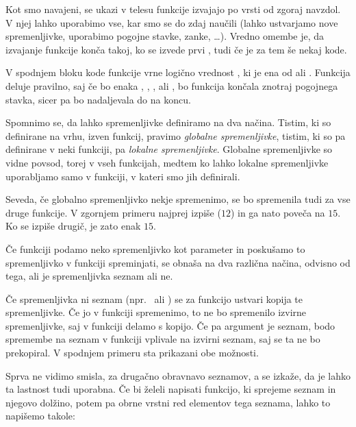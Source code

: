 
Kot smo navajeni, se ukazi v telesu funkcije izvajajo po vrsti od zgoraj
navzdol.
V njej lahko uporabimo vse, kar smo se do zdaj naučili (lahko ustvarjamo nove
spremenljivke, uporabimo pogojne stavke, zanke, \ldots).
Vredno omembe je, da izvajanje funkcije konča takoj, ko se izvede prvi
, tudi če je za tem še nekaj kode.

V spodnjem bloku kode funkcije vrne logično vrednost , ki je ena od
 ali .
Funkcija deluje pravilno, saj če bo  enaka , ,
,  ali , bo funkcija končala znotraj pogojnega
stavka, sicer pa bo nadaljevala do  na koncu.



Spomnimo se, da lahko spremenljivke definiramo na dva načina.
Tistim, ki so definirane na vrhu, izven funkcij, pravimo \emph{globalne
  spremenljivke}, tistim, ki so pa definirane v neki funkciji, pa \emph{lokalne
  spremenljivke}.
Globalne spremenljivke so vidne povsod, torej v vseh funkcijah, medtem ko lahko
lokalne spremenljivke uporabljamo samo v funkciji, v kateri smo jih definirali.


Seveda, če globalno spremenljivko nekje spremenimo, se bo spremenila tudi za
vse druge funkcije.
V zgornjem primeru  najprej izpiše  ($12$) in ga
nato poveča na $15$.
Ko se  izpiše drugič, je zato enak $15$.

Če funkciji podamo neko spremenljivko kot parameter in poskušamo to
spremenljivko v funkciji spreminjati, se obnaša na dva različna načina, odvisno
od tega, ali je spremenljivka seznam ali ne.

Če spremenljivka ni seznam (npr.~ ali ) se za funkcijo
ustvari kopija te spremenljivke.
Če jo v funkciji spremenimo, to ne bo spremenilo izvirne spremenljivke, saj v
funkciji delamo s kopijo.
Če pa argument je seznam, bodo spremembe na seznam v funkciji vplivale na
izvirni seznam, saj se ta ne bo prekopiral.
V spodnjem primeru sta prikazani obe možnosti.


Sprva ne vidimo smisla, za drugačno obravnavo seznamov, a se izkaže, da je
lahko ta lastnost tudi uporabna.
Če bi želeli napisati funkcijo, ki sprejeme seznam in njegovo dolžino, potem pa
obrne vrstni red elementov tega seznama, lahko to napišemo takole:

